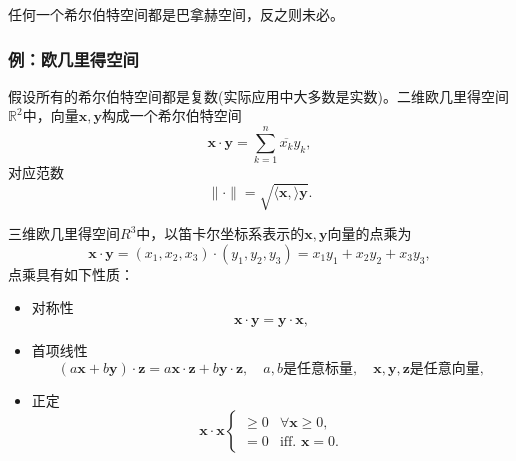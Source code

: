 任何一个希尔伯特空间都是巴拿赫空间，反之则未必。

\subsubsection{例：欧几里得空间}
\label{sec:hilbert-space-eucilidean-examples}
假设所有的希尔伯特空间都是复数(实际应用中大多数是实数)。二维欧几里得空间$\mathbb{R}^2$中，向量$\bm{x},\bm{y}$构成一个希尔伯特空间
\begin{equation*}
  \bm{x} \cdot \bm{y} = \sum_{k=1}^{n} \overline{x_k} y_k,
\end{equation*}
对应范数
\begin{equation*}
\| \cdot \| = \sqrt{\langle \bm{x}, \rangle{\bm{y}}}.
\end{equation*}

三维欧几里得空间$R^3$中，以笛卡尔坐标系表示的$\bm{x},\bm{y}$向量的点乘为
\begin{equation*}
  \bm{x} \cdot \bm{y} = \left( x_1, x_2, x_3 \right) \cdot \left( y_1,y_2,y_3 \right) = x_1 y_1 + x_2 y_2 + x_3 y_3,
\end{equation*}
点乘具有如下性质：
\begin{itemize}
  \item 对称性
  \begin{equation*}
    \bm{x} \cdot \bm{y} = \bm{y} \cdot \bm{x},
  \end{equation*}
  \item 首项线性
  \begin{equation*}
    \left( a \bm{x} + b \bm{y} \right) \cdot \bm{z} = a \bm{x} \cdot \bm{z} + b \bm{y} \cdot \bm{z}, \quad a,b \text{是任意标量}, \quad  \bm{x},\bm{y},\bm{z} \text{是任意向量},
  \end{equation*}
  \item 正定
  \begin{equation*}
    \bm{x} \cdot \bm{x} \begin{cases}
     \ge 0 & \forall \bm{x} \ge 0, \\
     =0 & \text{iff. } \bm{x} = 0.
    \end{cases}
  \end{equation*}
\end{itemize}

